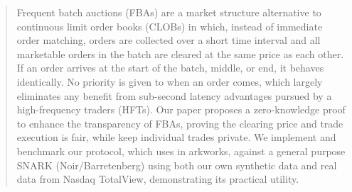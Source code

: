 \begin{abstract}

Frequent batch auctions (FBAs) are a market structure alternative to continuous limit order books (CLOBs) in which, instead of immediate order matching, orders are collected over a short time interval and all marketable orders in the batch are cleared at the same price as each other. If an order arrives at the start of the batch, middle, or end, it behaves identically. No priority is given to when an order comes, which largely eliminates any benefit from sub-second latency advantages pursued by a high-frequency traders (HFTs). Our paper proposes a zero-knowledge proof to enhance the transparency of FBAs, proving the clearing price and trade execution is fair, while keep individual trades private. We implement and benchmark our protocol, which uses \ari in arkworks, against a general purpose SNARK (Noir/Barretenberg) using both our own synthetic data and real data from Nasdaq TotalView, demonstrating its practical utility.

\end{abstract}